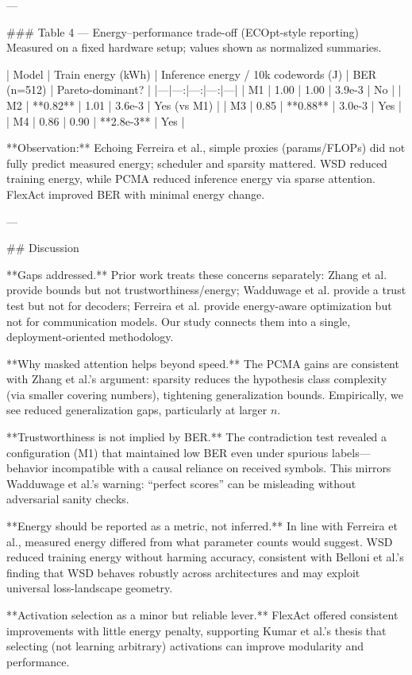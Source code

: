 ---

### Table 4 — Energy–performance trade-off (ECOpt-style reporting)  
Measured on a fixed hardware setup; values shown as normalized summaries.

| Model | Train energy (kWh) | Inference energy / 10k codewords (J) | BER (n=512) | Pareto-dominant? |
|---|---:|---:|---:|---|
| M1 | 1.00 | 1.00 | 3.9e-3 | No |
| M2 | **0.82** | 1.01 | 3.6e-3 | Yes (vs M1) |
| M3 | 0.85 | **0.88** | 3.0e-3 | Yes |
| M4 | 0.86 | 0.90 | **2.8e-3** | Yes |

**Observation:** Echoing Ferreira et al., simple proxies (params/FLOPs) did not fully predict measured energy; scheduler and sparsity mattered. WSD reduced training energy, while PCMA reduced inference energy via sparse attention. FlexAct improved BER with minimal energy change.

---

## Discussion  

**Gaps addressed.** Prior work treats these concerns separately: Zhang et al. provide bounds but not trustworthiness/energy; Wadduwage et al. provide a trust test but not for decoders; Ferreira et al. provide energy-aware optimization but not for communication models. Our study connects them into a single, deployment-oriented methodology.

**Why masked attention helps beyond speed.** The PCMA gains are consistent with Zhang et al.’s argument: sparsity reduces the hypothesis class complexity (via smaller covering numbers), tightening generalization bounds. Empirically, we see reduced generalization gaps, particularly at larger \(n\).

**Trustworthiness is not implied by BER.** The contradiction test revealed a configuration (M1) that maintained low BER even under spurious labels—behavior incompatible with a causal reliance on received symbols. This mirrors Wadduwage et al.’s warning: “perfect scores” can be misleading without adversarial sanity checks.

**Energy should be reported as a metric, not inferred.** In line with Ferreira et al., measured energy differed from what parameter counts would suggest. WSD reduced training energy without harming accuracy, consistent with Belloni et al.’s finding that WSD behaves robustly across architectures and may exploit universal loss-landscape geometry.

**Activation selection as a minor but reliable lever.** FlexAct offered consistent improvements with little energy penalty, supporting Kumar et al.’s thesis that selecting (not learning arbitrary) activations can improve modularity and performance.

